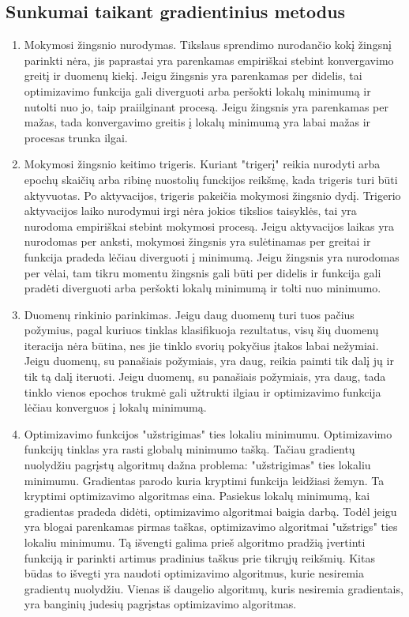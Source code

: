 \documentclass{VUMIFInfKursinis}
\begin{document}
\subsection{Sunkumai taikant gradientinius metodus}
\begin{enumerate}
\item Mokymosi žingsnio nurodymas. Tikslaus sprendimo nurodančio kokį žingsnį parinkti nėra, jis paprastai
yra parenkamas empiriškai stebint konvergavimo greitį ir duomenų kiekį. Jeigu žingsnis yra parenkamas per didelis,
tai optimizavimo funkcija gali diverguoti arba peršokti lokalų minimumą ir nutolti nuo jo, taip praiilginant
procesą. Jeigu žingsnis yra parenkamas per mažas, tada konvergavimo greitis į lokalų minimumą yra labai mažas
ir procesas trunka ilgai. \cite{salt17}
\item Mokymosi žingsnio keitimo trigeris. Kuriant "trigerį" reikia nurodyti arba epochų skaičių arba ribinę nuostolių
funckijos reikšmę, kada trigeris turi būti aktyvuotas. Po aktyvacijos, trigeris pakeičia mokymosi žingsnio dydį.
Trigerio aktyvacijos laiko nurodymui irgi nėra jokios tikslios taisyklės, tai yra nurodoma empiriškai stebint
mokymosi procesą. Jeigu aktyvacijos laikas yra nurodomas per anksti, mokymosi žingsnis yra sulėtinamas per greitai
ir funkcija pradeda lėčiau diverguoti į minimumą. Jeigu žingsnis yra nurodomas per vėlai, tam tikru momentu
žingsnis gali būti per didelis ir funkcija gali pradėti diverguoti arba peršokti lokalų minimumą ir tolti nuo
minimumo. \cite{salt17}
\item Duomenų rinkinio parinkimas. Jeigu daug duomenų turi tuos pačius požymius, pagal kuriuos tinklas klasifikuoja
rezultatus, visų šių duomenų iteracija nėra būtina, nes jie tinklo svorių pokyčius įtakos labai nežymiai.
Jeigu duomenų, su panašiais požymiais, yra daug, reikia paimti tik dalį jų ir tik tą dalį iteruoti. Jeigu
duomenų, su panašiais požymiais, yra daug, tada tinklo vienos epochos trukmė gali užtrukti ilgiau ir optimizavimo
funkcija lėčiau konverguos į lokalų minimumą. \cite{salt17}
\item Optimizavimo funkcijos "užstrigimas" ties lokaliu minimumu. Optimizavimo funkcijų tinklas yra rasti
globalų minimumo tašką. Tačiau gradientų nuolydžiu pagrįstų algoritmų dažna problema: "užstrigimas" ties
lokaliu minimumu. Gradientas parodo kuria kryptimi funkcija leidžiasi žemyn. Ta kryptimi optimizavimo algoritmas
eina. Pasiekus lokalų minimumą, kai gradientas pradeda didėti, optimizavimo algoritmai baigia darbą. Todėl jeigu yra
blogai parenkamas pirmas taškas, optimizavimo algoritmai "užstrigs" ties lokaliu minimumu. \cite{salt17} Tą išvengti galima prieš algoritmo pradžią
įvertinti funkciją ir parinkti artimus pradinius taškus prie tikrųjų reikšmių. Kitas būdas to išvegti yra naudoti
optimizavimo algoritmus, kurie nesiremia gradientų nuolydžiu. Vienas iš daugelio algoritmų, kuris nesiremia gradientais, yra
banginių judesių pagrįstas optimizavimo algoritmas.
\end{enumerate}
\end{document}
